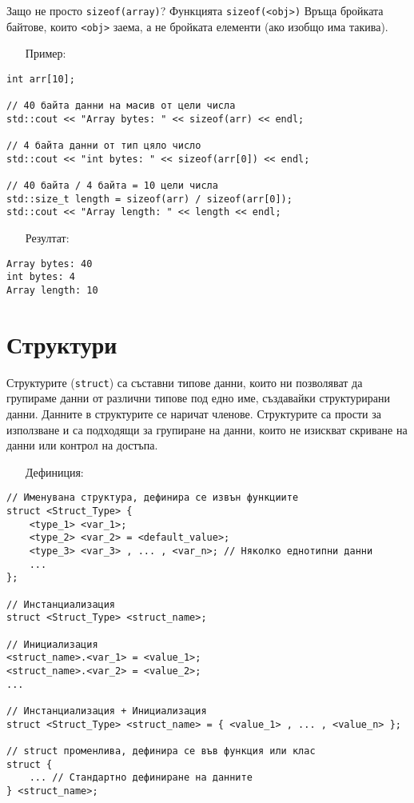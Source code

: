 \documentclass[oneside]{book}
\newcommand*{\code}[1]{\texttt{#1}}
\begin{document}
Защо не просто \code{sizeof(array)}? Функцията \code{sizeof(<obj>)} Връща бройката байтове, които \code{<obj>} заема, а не бройката елементи (ако изобщо има такива).

\begin{itemize}\item[Пример:]\end{itemize}
\begin{mdframed}\begin{lstlisting}
int arr[10];

// 40 байта данни на масив от цели числа
std::cout << "Array bytes: " << sizeof(arr) << endl;

// 4 байта данни от тип цяло число
std::cout << "int bytes: " << sizeof(arr[0]) << endl;

// 40 байта / 4 байта = 10 цели числа
std::size_t length = sizeof(arr) / sizeof(arr[0]);
std::cout << "Array length: " << length << endl;
\end{lstlisting}\end{mdframed}

\begin{itemize}\item[Резултат:]\end{itemize}
\begin{mdframed}\begin{lstlisting}[language={}]
Array bytes: 40
int bytes: 4
Array length: 10
\end{lstlisting}\end{mdframed}

\section{Структури}
Структурите (\code{struct}) са съставни типове данни, които ни позволяват да групираме данни от различни типове под едно име, създавайки структурирани данни.
Данните в структурите се наричат членове. Структурите са прости за използване и са подходящи за групиране на данни, които не изискват скриване на данни или контрол на достъпа.
\pagebreak
\begin{itemize}\item[Дефиниция:]\end{itemize}
\begin{mdframed}\begin{lstlisting}
// Именувана структура, дефинира се извън функциите
struct <Struct_Type> {
    <type_1> <var_1>;
    <type_2> <var_2> = <default_value>;
    <type_3> <var_3> , ... , <var_n>; // Няколко еднотипни данни
    ...
};

// Инстанциализация
struct <Struct_Type> <struct_name>;

// Инициализация
<struct_name>.<var_1> = <value_1>;
<struct_name>.<var_2> = <value_2>;
...

// Инстанциализация + Инициализация
struct <Struct_Type> <struct_name> = { <value_1> , ... , <value_n> };

// struct променлива, дефинира се във функция или клас
struct {
    ... // Стандартно дефиниране на данните
} <struct_name>;
\end{lstlisting}\end{mdframed}
\end{document}
